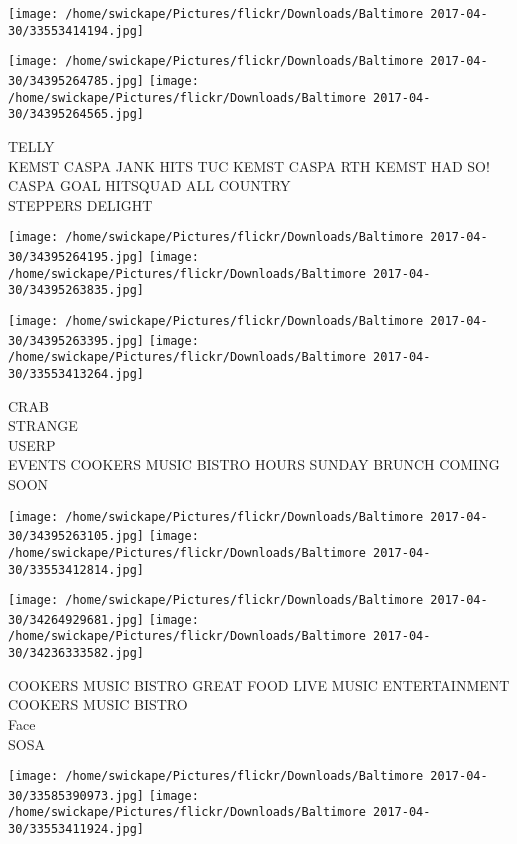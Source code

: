 \documentclass[10pt,letterpaper]{article}
\begin{document}
\texttt{[image: /home/swickape/Pictures/flickr/Downloads/Baltimore 2017-04-30/33553414194.jpg]}

\vspace{0.25in}
\texttt{[image: /home/swickape/Pictures/flickr/Downloads/Baltimore 2017-04-30/34395264785.jpg]}
\texttt{[image: /home/swickape/Pictures/flickr/Downloads/Baltimore 2017-04-30/34395264565.jpg]}

TELLY\\
KEMST CASPA JANK HITS TUC KEMST CASPA RTH KEMST HAD SO!  CASPA GOAL HITSQUAD ALL COUNTRY\\
STEPPERS DELIGHT\\
\pagebreak

\texttt{[image: /home/swickape/Pictures/flickr/Downloads/Baltimore 2017-04-30/34395264195.jpg]}
\texttt{[image: /home/swickape/Pictures/flickr/Downloads/Baltimore 2017-04-30/34395263835.jpg]}

\texttt{[image: /home/swickape/Pictures/flickr/Downloads/Baltimore 2017-04-30/34395263395.jpg]}
\texttt{[image: /home/swickape/Pictures/flickr/Downloads/Baltimore 2017-04-30/33553413264.jpg]}

CRAB\\
STRANGE\\
USERP\\
EVENTS COOKERS MUSIC BISTRO HOURS SUNDAY BRUNCH COMING SOON\\
\pagebreak

\texttt{[image: /home/swickape/Pictures/flickr/Downloads/Baltimore 2017-04-30/34395263105.jpg]}
\texttt{[image: /home/swickape/Pictures/flickr/Downloads/Baltimore 2017-04-30/33553412814.jpg]}

\texttt{[image: /home/swickape/Pictures/flickr/Downloads/Baltimore 2017-04-30/34264929681.jpg]}
\texttt{[image: /home/swickape/Pictures/flickr/Downloads/Baltimore 2017-04-30/34236333582.jpg]}

COOKERS MUSIC BISTRO GREAT FOOD LIVE MUSIC ENTERTAINMENT\\
COOKERS MUSIC BISTRO\\
Face\\
SOSA\\
\pagebreak

\texttt{[image: /home/swickape/Pictures/flickr/Downloads/Baltimore 2017-04-30/33585390973.jpg]}
\texttt{[image: /home/swickape/Pictures/flickr/Downloads/Baltimore 2017-04-30/33553411924.jpg]}
\end{document}
